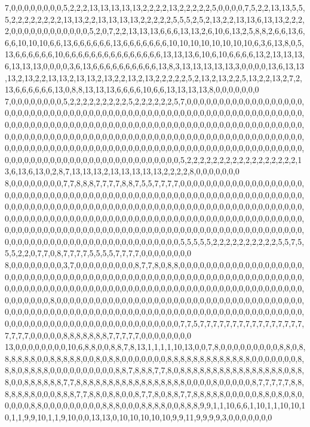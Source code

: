 7,0,0,0,0,0,0,0,0,5,2,2,2,13,13,13,13,13,2,2,2,2,13,2,2,2,2,2,5,0,0,0,0,7,5,2,2,13,13,5,5,5,2,2,2,2,2,2,2,2,13,13,2,2,13,13,13,13,2,2,2,2,2,5,5,5,2,5,2,13,2,2,13,13,6,13,13,2,2,2,2,0,0,0,0,0,0,0,0,0,0,0,0,5,2,0,7,2,2,13,13,13,6,6,6,13,13,2,6,10,6,13,2,5,8,8,2,6,6,13,6,6,6,10,10,10,6,6,13,6,6,6,6,6,6,13,6,6,6,6,6,6,6,10,10,10,10,10,10,10,10,6,3,6,13,8,0,5,13,6,6,6,6,6,6,10,6,6,6,6,6,6,6,6,6,6,6,6,6,6,6,13,13,13,6,10,6,10,6,6,6,6,13,2,13,13,13,6,13,13,13,0,0,0,0,3,6,13,6,6,6,6,6,6,6,6,6,6,13,8,3,13,13,13,13,13,3,0,0,0,0,13,6,13,13,13,2,13,2,2,13,13,2,13,13,2,13,2,2,13,2,13,2,2,2,2,2,5,2,13,2,13,2,2,5,13,2,2,13,2,7,2,13,6,6,6,6,6,6,13,0,8,8,13,13,13,6,6,6,6,10,6,6,13,13,13,13,8,0,0,0,0,0,0,0
7,0,0,0,0,0,0,0,0,5,2,2,2,2,2,2,2,2,2,5,2,2,2,2,2,2,5,7,0,0,0,0,0,0,0,0,0,0,0,0,0,0,0,0,0,0,0,0,0,0,0,0,0,0,0,0,0,0,0,0,0,0,0,0,0,0,0,0,0,0,0,0,0,0,0,0,0,0,0,0,0,0,0,0,0,0,0,0,0,0,0,0,0,0,0,0,0,0,0,0,0,0,0,0,0,0,0,0,0,0,0,0,0,0,0,0,0,0,0,0,0,0,0,0,0,0,0,0,0,0,0,0,0,0,0,0,0,0,0,0,0,0,0,0,0,0,0,0,0,0,0,0,0,0,0,0,0,0,0,0,0,0,0,0,0,0,0,0,0,0,0,0,0,0,0,0,0,0,0,0,0,0,0,0,0,0,0,0,0,0,0,0,0,0,0,0,0,0,0,0,0,0,0,0,0,0,0,0,0,0,0,0,0,0,0,0,0,0,0,0,0,0,0,0,0,0,0,0,0,0,0,0,0,0,0,0,0,0,0,0,0,0,0,0,0,0,0,0,0,0,0,0,0,0,0,0,0,5,2,2,2,2,2,2,2,2,2,2,2,2,2,2,2,2,2,13,6,13,6,13,0,2,8,7,13,13,13,2,13,13,13,13,13,2,2,2,2,8,0,0,0,0,0,0,0
8,0,0,0,0,0,0,0,0,7,7,8,8,8,7,7,7,7,8,8,7,5,5,7,7,7,7,0,0,0,0,0,0,0,0,0,0,0,0,0,0,0,0,0,0,0,0,0,0,0,0,0,0,0,0,0,0,0,0,0,0,0,0,0,0,0,0,0,0,0,0,0,0,0,0,0,0,0,0,0,0,0,0,0,0,0,0,0,0,0,0,0,0,0,0,0,0,0,0,0,0,0,0,0,0,0,0,0,0,0,0,0,0,0,0,0,0,0,0,0,0,0,0,0,0,0,0,0,0,0,0,0,0,0,0,0,0,0,0,0,0,0,0,0,0,0,0,0,0,0,0,0,0,0,0,0,0,0,0,0,0,0,0,0,0,0,0,0,0,0,0,0,0,0,0,0,0,0,0,0,0,0,0,0,0,0,0,0,0,0,0,0,0,0,0,0,0,0,0,0,0,0,0,0,0,0,0,0,0,0,0,0,0,0,0,0,0,0,0,0,0,0,0,0,0,0,0,0,0,0,0,0,0,0,0,0,0,0,0,0,0,0,0,0,0,0,0,0,0,0,0,0,0,0,0,0,0,5,5,5,5,5,2,2,2,2,2,2,2,2,2,2,5,5,7,5,5,5,2,2,0,7,7,0,8,7,7,7,7,5,5,5,5,7,7,7,7,0,0,0,0,0,0,0,0
8,0,0,0,0,0,0,0,0,3,7,0,0,0,0,0,0,0,0,0,8,7,7,8,0,8,8,0,0,0,0,0,0,0,0,0,0,0,0,0,0,0,0,0,0,0,0,0,0,0,0,0,0,0,0,0,0,0,0,0,0,0,0,0,0,0,0,0,0,0,0,0,0,0,0,0,0,0,0,0,0,0,0,0,0,0,0,0,0,0,0,0,0,0,0,0,0,0,0,0,0,0,0,0,0,0,0,0,0,0,0,0,0,0,0,0,0,0,0,0,0,0,0,0,0,0,0,0,0,0,0,0,0,0,0,0,0,0,0,0,0,0,0,0,0,8,0,0,0,0,0,0,0,0,0,0,0,0,0,0,0,0,0,0,0,0,0,0,0,0,0,0,0,0,0,0,0,0,0,0,0,0,0,0,0,0,0,0,0,0,0,0,0,0,0,0,0,0,0,0,0,0,0,0,0,0,0,0,0,0,0,0,0,0,0,0,0,0,0,0,0,0,0,0,0,0,0,0,0,0,0,0,0,0,0,0,0,0,0,0,0,0,0,0,0,0,0,0,0,0,0,0,0,0,0,0,0,7,7,5,7,7,7,7,7,7,7,7,7,7,7,7,7,7,7,7,7,7,7,7,0,0,0,0,0,8,8,8,8,8,8,8,7,7,7,7,7,0,0,0,0,0,0,0,0
13,0,0,0,0,0,0,0,0,10,6,8,8,0,0,8,8,7,8,13,1,1,1,1,10,13,0,0,7,8,0,0,0,0,0,0,0,0,0,8,8,0,8,8,8,8,8,8,0,0,8,8,8,8,8,0,0,8,0,8,8,0,0,0,0,0,0,0,8,8,8,8,8,8,8,8,8,8,8,8,8,0,0,0,0,0,0,0,8,8,8,0,8,8,8,8,0,0,0,0,0,0,0,0,0,0,8,8,7,8,8,8,7,7,8,0,8,8,8,8,8,8,8,8,8,8,8,8,8,8,8,8,0,8,8,8,0,0,8,8,8,8,8,8,7,7,8,8,8,8,8,8,8,8,8,8,8,8,8,8,8,8,8,0,0,0,0,8,0,0,0,0,0,8,7,7,7,7,7,8,8,8,8,8,8,8,0,0,0,8,8,8,7,7,8,8,0,8,8,0,0,8,7,7,8,0,8,8,7,7,8,8,8,8,8,0,0,0,0,0,8,8,0,8,0,8,0,0,0,0,0,8,8,0,0,0,0,0,0,0,0,0,8,8,8,0,0,0,8,8,8,8,0,0,8,8,8,9,9,1,1,10,6,6,1,10,1,1,10,10,10,1,1,9,9,10,1,1,9,10,0,0,13,13,0,10,10,10,10,10,9,9,11,9,9,9,9,3,0,0,0,0,0,0,0
